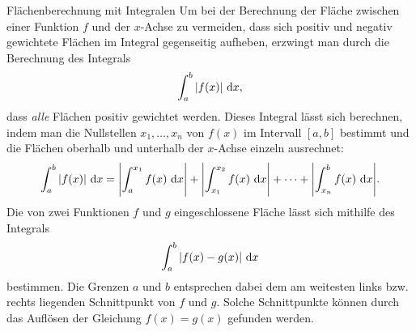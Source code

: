 \documentclass[../../main.tex]{subfiles}
\begin{document}
\begin{nutshell}{Flächenberechnung mit Integralen}
    Um bei der Berechnung der Fläche zwischen einer Funktion $f$ und der $x$-Achse zu vermeiden, dass sich positiv und
    negativ gewichtete Flächen im Integral gegenseitig aufheben, erzwingt man durch die Berechnung des Integrals
    \[\int_a^b|f(x)|\mathop{}\mathrm{d} x,\]
    dass \emph{alle} Flächen positiv gewichtet werden. Dieses Integral lässt sich berechnen, indem man die Nullstellen
    $x_1,\dots,x_n$ von $f(x)$ im Intervall $[a,b]$ bestimmt und die Flächen oberhalb und unterhalb der $x$-Achse einzeln
    ausrechnet:
    \[\int_a^b|f(x)|\mathop{}\mathrm{d} x=\Biggl|\int_a^{x_1}f(x)\mathop{}\mathrm{d} x\Biggr|+\Biggl|\int_{x_1}^{x_2}f(x)\mathop{}\mathrm{d} x\Biggr|+\dots+
    \Biggl|\int_{x_n}^bf(x)\mathop{}\mathrm{d} x\Biggr|.\]
    Die von zwei Funktionen $f$ und $g$ eingeschlossene Fläche lässt sich mithilfe des Integrals
    \[\int_a^b|f(x)-g(x)|\mathop{}\mathrm{d} x\]
    bestimmen. Die Grenzen $a$ und $b$ entsprechen dabei dem am weitesten links bzw. rechts liegenden Schnittpunkt von
    $f$ und $g$. Solche Schnittpunkte können durch das Auflösen der Gleichung $f(x)=g(x)$ gefunden werden.
\end{nutshell}
\end{document}
